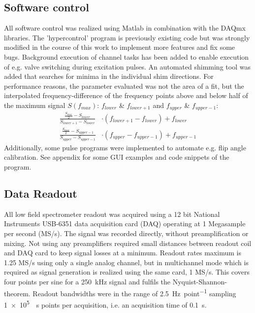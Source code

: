         \subsection{Software control}
        \label{sec:matMeth:hypercontrol}
        All software control was realized using Matlab in combination with the DAQmx libraries. The 'hypercontrol' program is previously existing code but was strongly modified in the course of this work to implement more features and fix some bugs. Background execution of channel tasks has been added to enable execution of e.g. valve switching during excitation pulses. An automated shimming tool was added that searches for minima in the individual shim directions. For performance reasons, the parameter evaluated was not the area of a fit, but the interpolated frequency-difference of the frequency points above and below half of the maximum signal $S(f_{max})$: $f_{lower}$ \& $f_{lower+1}$ and $f_{upper}$ \& $f_{upper-1}$:
        \begin{equation}
            \begin{aligned}
                \frac{\frac{S_{max}}{2} - S_{lower}}{S_{lower+1} -S_{lower}}&\cdot (f_{lower + 1} -f_{lower}) + f_{lower}\\
                \frac{\frac{S_{max}}{2} - S_{upper -1}}{S_{upper} -S_{upper-1}}& \cdot (f_{upper} -f_{upper-1}) + f_{upper -1}
            \end{aligned}
        \end{equation}
            Additionally, some pulse programs were implemented to automate e.g. flip angle calibration. See appendix for some GUI examples and code snippets of the program.
        \subsection{Data Readout}
        All low field spectrometer readout was acquired using a 12 bit National Instruments USB-6351 data acquisition card (DAQ) operating at 1 Megasample per second (MS/s). The signal was recorded directly, without preamplification or mixing. Not using any preamplifiers required small distances between readout coil and DAQ card to keep signal losses at a minimum. Readout rates maximum is 1.25 MS/s using only a single analog channel, but in multichannel mode which is required as signal generation is realized using the same card, 1 MS/s. This covers four points per sine for a \SI{250}{\kilo\hertz} signal and fulfils the Nyquist-Shannon-theorem. Readout bandwidths were in the range of \SI{2.5}{\hertz\per point} sampling \SI{1e5}{\per\second} points per acquisition, i.e. an acquisition time of \SI{0.1}{\second}.
